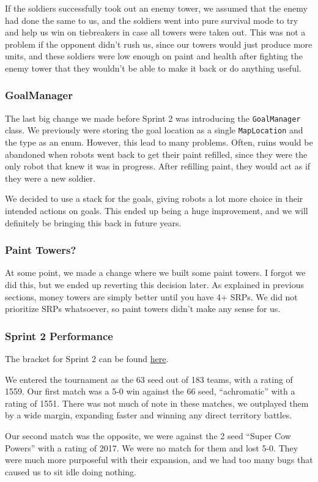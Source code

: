 \medskip

If the soldiers successfully took out an enemy tower, we assumed that the enemy had done the same to us, and the soldiers went into pure survival mode to try and help us win on tiebreakers in case all towers were taken out. This was not a problem if the opponent didn't rush us, since our towers would just produce more units, and these soldiers were low enough on paint and health after fighting the enemy tower that they wouldn't be able to make it back or do anything useful.

\subsubsection{GoalManager}

The last big change we made before Sprint 2 was introducing the \verb|GoalManager| class. We previously were storing the goal location as a single \verb|MapLocation| and the type as an enum. However, this lead to many problems. Often, ruins would be abandoned when robots went back to get their paint refilled, since they were the only robot that knew it was in progress. After refilling paint, they would act as if they were a new soldier.

\medskip

We decided to use a stack for the goals, giving robots a lot more choice in their intended actions on goals. This ended up being a huge improvement, and we will definitely be bringing this back in future years.

\subsubsection{Paint Towers?}

At some point, we made a change where we built some paint towers. I forgot we did this, but we ended up reverting this decision later. As explained in previous sections, money towers are simply better until you have 4+ SRPs. We did not prioritize SRPs whatsoever, so paint towers didn't make any sense for us.

\subsubsection{Sprint 2 Performance}

The bracket for Sprint 2 can be found \href{https://challonge.com/bc25javasprint2}{here}.

\medskip

We entered the tournament as the 63 seed out of 183 teams, with a rating of 1559. Our first match was a 5-0 win against the 66 seed, ``achromatic'' with a rating of 1551. There was not much of note in these matches, we outplayed them by a wide margin, expanding faster and winning any direct territory battles.

\medskip

Our second match was the opposite, we were against the 2 seed ``Super Cow Powers'' with a rating of 2017. We were no match for them and lost 5-0. They were much more purposeful with their expansion, and we had too many bugs that caused us to sit idle doing nothing.